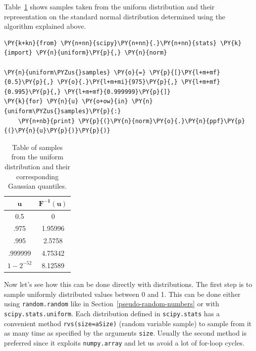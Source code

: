 Table~\ref{tab:transformation} shows samples taken from the
uniform distribution and their representation on the standard normal
distribution determined using the algorithm explained above.

\begin{tcolorbox}[breakable, size=fbox, boxrule=1pt, pad at break*=1mm,colback=cellbackground, colframe=cellborder]
\begin{Verbatim}[commandchars=\\\{\}]
\PY{k+kn}{from} \PY{n+nn}{scipy}\PY{n+nn}{.}\PY{n+nn}{stats} \PY{k}{import} \PY{n}{uniform}\PY{p}{,} \PY{n}{norm}
		
\PY{n}{uniform\PYZus{}samples} \PY{o}{=} \PY{p}{[}\PY{l+m+mf}{0.5}\PY{p}{,} \PY{o}{.}\PY{l+m+mi}{975}\PY{p}{,} \PY{l+m+mf}{0.995}\PY{p}{,} \PY{l+m+mf}{0.999999}\PY{p}{]}
\PY{k}{for} \PY{n}{u} \PY{o+ow}{in} \PY{n}{uniform\PYZus{}samples}\PY{p}{:}
    \PY{n+nb}{print} \PY{p}{(}\PY{n}{norm}\PY{o}{.}\PY{n}{ppf}\PY{p}{(}\PY{n}{u}\PY{p}{)}\PY{p}{)}
\end{Verbatim}
\end{tcolorbox}

\begin{table}[h]
  \centering
  \begin{tabular}{|c|c|}
    \hline
    \(\mathbf{u}\) & \(\mathbf{F^{-1}(u)}\) \\
    \hline
    0.5 & 0 \\
    \hline
    .975 & 1.95996 \\
    \hline
    .995 & 2.5758 \\
    \hline
    .999999 & 4.75342 \\
    \hline
    \(1-2^{-52}\) & 8.12589 \\
    \hline
  \end{tabular}
  \caption{Table of samples from the uniform distribution and their corresponding Gaussian quantiles.}
\label{tab:transformation}
\end{table}

Now let's see how this can be done directly with distributions. The first step is to sample
uniformly distributed values between 0 and 1. This can be done either using \texttt{random.random} like in Section~\ref{pseudo-random-numbers} or with \texttt{scipy.stats.uniform}. Each distribution defined in \texttt{scipy.stats} has a convenient method \texttt{rvs(size=aSize)} (random variable sample) to sample from it as many time as specified by the arguments \texttt{size}. Usually the second method is preferred since it exploits \texttt{numpy.array} and let us avoid a lot of for-loop cycles.

